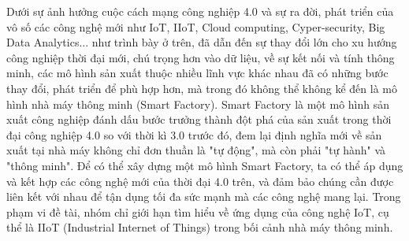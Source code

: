
Dưới sự ảnh hưởng cuộc cách mạng công nghiệp 4.0 và sự ra đời, phát triển của vô số các công nghệ mới như IoT, IIoT, Cloud computing, Cyper-security, Big Data Analytics... như trình bày ở trên, đã dẫn đến sự thay đổi lớn cho xu hướng công nghiệp thời đại mới, chú trọng hơn vào dữ liệu, về sự kết nối và tính thông minh, các mô hình sản xuất thuộc nhiều lĩnh vực khác nhau đã có những bước thay đổi, phát triển để phù hợp hơn, mà trong đó không thể không kể đến là mô hình nhà máy thông minh (Smart Factory). Smart Factory là một mô hình sản xuất công nghiệp đánh dấu bước trưởng thành đột phá của sản xuất trong thời đại công nghiệp 4.0 so với thời kì 3.0 trước đó, đem lại định nghĩa mới về sản xuất tại nhà máy không chỉ đơn thuần là "tự động", mà còn phải "tự hành" và "thông minh". Để có thể xây dựng một mô hình Smart Factory, ta có thể áp dụng và kết hợp các công nghệ mới của thời đại 4.0 trên, và đảm bảo chúng cần được liên kết với nhau để tận dụng tối đa sức mạnh mà các công nghệ mang lại. Trong phạm vi đề tài, nhóm chỉ giới hạn tìm hiểu về ứng dụng của công nghệ IoT, cụ thể là IIoT (Industrial Internet of Things) trong bối cảnh nhà máy thông minh.

